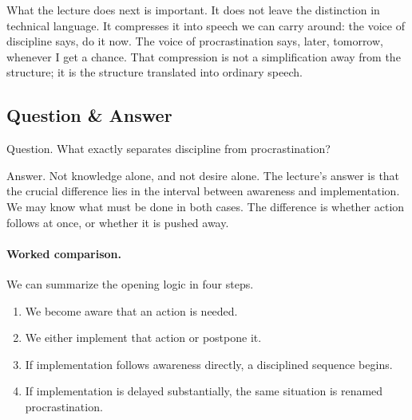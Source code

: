 \begin{figure}
\centering
{}
\end{figure}

What the lecture does next is important. It does not leave the distinction in technical language. It compresses it into speech we can carry around: the voice of discipline says, do it now. The voice of procrastination says, later, tomorrow, whenever I get a chance. That compression is not a simplification away from the structure; it is the structure translated into ordinary speech.

\subsection{Question \& Answer}

Question. What exactly separates discipline from procrastination?

Answer. Not knowledge alone, and not desire alone. The lecture's answer is that the crucial difference lies in the interval between awareness and implementation. We may know what must be done in both cases. The difference is whether action follows at once, or whether it is pushed away.

\paragraph{Worked comparison.}
We can summarize the opening logic in four steps.
\begin{enumerate}
\item We become aware that an action is needed.
\item We either implement that action or postpone it.
\item If implementation follows awareness directly, a disciplined sequence begins.
\item If implementation is delayed substantially, the same situation is renamed procrastination.
\end{enumerate}

